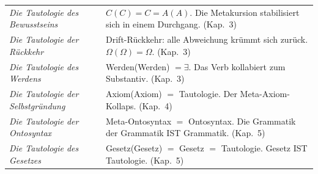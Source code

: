 \documentclass[10pt, openany, oneside]{book}
\begin{document}
{\begin{tabular}{@{} p{} @{\hspace{0.5em}} p{} @{}}
\textit{Die Tautologie des Bewusstseins} & $C(C) = C = A(A)$. Die Metakursion stabilisiert sich in einem Durchgang. (Kap.\ 3) \\[0.3em]

\textit{Die Tautologie der Rückkehr} & Drift-Rückkehr: alle Abweichung krümmt sich zurück. $\Omega(\Omega) = \Omega$. (Kap.\ 3) \\[0.3em]

\textit{Die Tautologie des Werdens} & Werden(Werden) $= \exists$. Das Verb kollabiert zum Substantiv. (Kap.\ 3) \\[0.3em]

\textit{Die Tautologie der Selbstgründung} & Axiom(Axiom) $=$ Tautologie. Der Meta-Axiom-Kollaps. (Kap.\ 4) \\[0.3em]

\textit{Die Tautologie der Ontosyntax} & Meta-Ontosyntax $=$ Ontosyntax. Die Grammatik der Grammatik IST Grammatik. (Kap.\ 5) \\[0.3em]

\textit{Die Tautologie des Gesetzes} & Gesetz(Gesetz) $=$ Gesetz $=$ Tautologie. Gesetz IST Tautologie. (Kap.\ 5) \\[0.3em]

\end{tabular}
}
\end{document}
